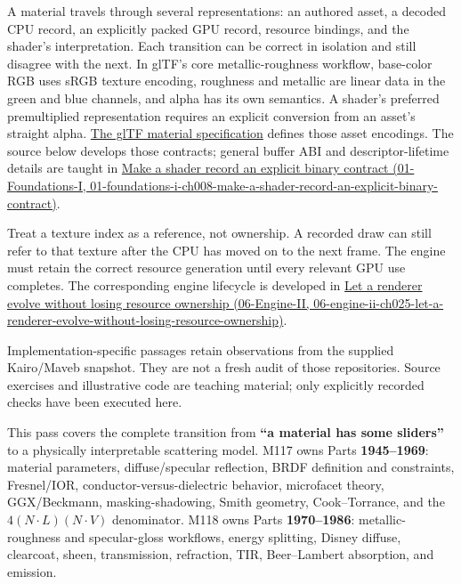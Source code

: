 A material travels through several representations: an authored asset, a decoded CPU record, an explicitly packed GPU record, resource bindings, and the shader's interpretation. Each transition can be correct in isolation and still disagree with the next. In glTF's core metallic-roughness workflow, base-color RGB uses sRGB texture encoding, roughness and metallic are linear data in the green and blue channels, and alpha has its own semantics. A shader's preferred premultiplied representation requires an explicit conversion from an asset's straight alpha. \href{https://raw.githubusercontent.com/KhronosGroup/glTF/main/specification/2.0/Specification.adoc}{The glTF material specification} defines those asset encodings. The source below develops those contracts; general buffer ABI and descriptor-lifetime details are taught in \href{../01-Foundations-I/main.pdf\#nameddest=01-foundations-i-ch008-make-a-shader-record-an-explicit-binary-contract}{Make a shader record an explicit binary contract (01-Foundations-I, 01-foundations-i-ch008-make-a-shader-record-an-explicit-binary-contract)}.

Treat a texture index as a reference, not ownership. A recorded draw can still refer to that texture after the CPU has moved on to the next frame. The engine must retain the correct resource generation until every relevant GPU use completes. The corresponding engine lifecycle is developed in \href{../06-Engine-II/main.pdf\#nameddest=06-engine-ii-ch025-let-a-renderer-evolve-without-losing-resource-ownership}{Let a renderer evolve without losing resource ownership (06-Engine-II, 06-engine-ii-ch025-let-a-renderer-evolve-without-losing-resource-ownership)}.

Implementation-specific passages retain observations from the supplied Kairo/Maveb snapshot. They are not a fresh audit of those repositories. Source exercises and illustrative code are teaching material; only explicitly recorded checks have been executed here.

This pass covers the complete transition from \textbf{``a material has some sliders''} to a physically interpretable scattering model. M117 owns Parts \textbf{1945--1969}: material parameters, diffuse/specular reflection, BRDF definition and constraints, Fresnel/IOR, conductor-versus-dielectric behavior, microfacet theory, GGX/Beckmann, masking-shadowing, Smith geometry, Cook--Torrance, and the \(4(N\!\cdot L)(N\!\cdot V)\) denominator. M118 owns Parts \textbf{1970--1986}: metallic-roughness and specular-gloss workflows, energy splitting, Disney diffuse, clearcoat, sheen, transmission, refraction, TIR, Beer--Lambert absorption, and emission.

